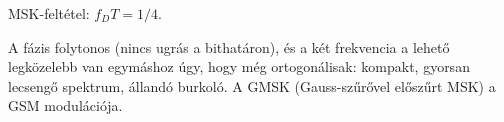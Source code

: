 MSK-feltétel: $f_DT=1/4$.

\begin{center}\end{center}

A fázis folytonos (nincs ugrás a bithatáron), és a két frekvencia a lehető legközelebb van egymáshoz úgy, hogy még ortogonálisak: kompakt, gyorsan lecsengő spektrum, állandó burkoló. A GMSK (Gauss-szűrővel előszűrt MSK) a GSM modulációja.
\begin{eredmeny}

\begin{center}\end{center}
\end{eredmeny}


